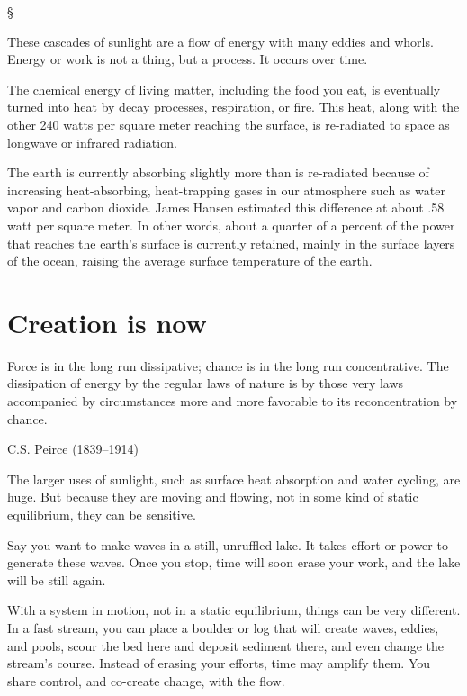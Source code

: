 \documentclass[11pt,letterpaper,twoside,onecolumn]{memoir}
\begin{document}
\vspace*{1em}
\begin{center}

\S
\vspace*{1em}
\end{center}

\noindent These cascades of sunlight are a flow of energy with many eddies and whorls. Energy or work is not a thing, but a process. It occurs over time.

The chemical energy of living matter, including the food you eat, is eventually turned into heat by decay processes, respiration, or fire. This heat, along with the other 240 watts per square meter reaching the surface, is re-radiated to space as longwave or infrared radiation.

The earth is currently absorbing slightly more than is re-radiated because of increasing heat-absorbing, heat-trapping gases in our atmosphere such as water vapor and carbon dioxide. James Hansen\label{half watt} estimated this difference at about .58 watt per square meter. In other words, about a quarter of a percent of the power that reaches the earth's surface is currently retained, mainly in the surface layers of the ocean, raising the average surface temperature of the earth.


\section*{Creation is now}

\epigraph{Force is in the long run dissipative; chance is in the long run concentrative. The dissipation of energy by the regular laws of nature is by those very laws accompanied by circumstances more and more favorable to its reconcentration by chance.}{C.S. Peirce (1839--1914)}

\noindent The larger uses of sunlight, such as surface heat absorption and water cycling, are huge. But because they are moving and flowing, not in some kind of static equilibrium, they can be sensitive.

Say you want to make waves in a still, unruffled lake. It takes effort or power to generate these waves. Once you stop, time will soon erase your work, and the lake will be still again.

With a system in motion, not in a static equilibrium, things can be very different. In a fast stream, you can place a boulder or log that will create waves, eddies, and pools, scour the bed here and deposit sediment there, and even change the stream's course. Instead of erasing your efforts, time may amplify them. You share control, and co-create change, with the flow.
\end{document}
